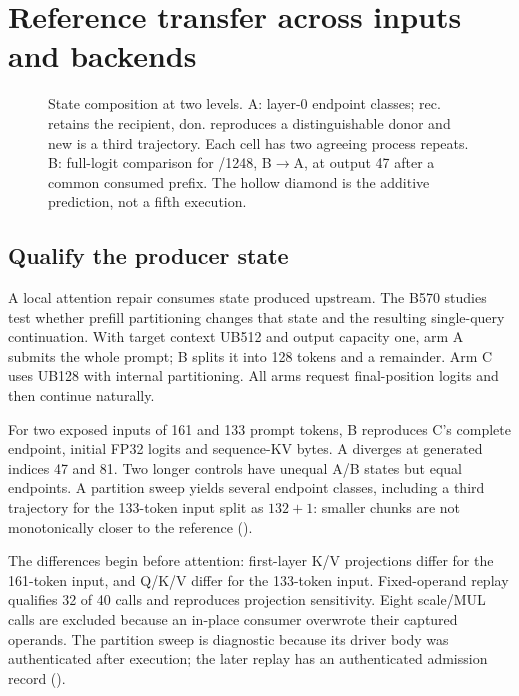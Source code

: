 \section{Reference transfer across inputs and backends}
\label{sec:state}


\begin{figure}[t]\centering
\resizebox{\textwidth}{!}{}
\caption{State composition at two levels. A: layer-0 endpoint classes; rec. retains the recipient, don. reproduces a distinguishable donor and new is a third trajectory. Each cell has two agreeing process repeats. B: full-logit comparison for /1248, B$\to$A, at output 47 after a common consumed prefix. The hollow diamond is the additive prediction, not a fifth execution.}
\label{fig:composition}
\end{figure}

\subsection{Qualify the producer state}
A local attention repair consumes state produced upstream. The B570 studies test whether prefill partitioning changes that state and the resulting single-query continuation. With target context UB512 and output capacity one, arm A submits the whole prompt; B splits it into 128 tokens and a remainder. Arm C uses UB128 with internal partitioning. All arms request final-position logits and then continue naturally.

For two exposed inputs of 161 and 133 prompt tokens, B reproduces C's complete endpoint, initial FP32 logits and sequence-KV bytes. A diverges at generated indices 47 and 81. Two longer controls have unequal A/B states but equal endpoints. A partition sweep yields several endpoint classes, including a third trajectory for the 133-token input split as $132+1$: smaller chunks are not monotonically closer to the reference ().

The differences begin before attention: first-layer K/V projections differ for the 161-token input, and Q/K/V differ for the 133-token input. Fixed-operand replay qualifies 32 of 40 calls and reproduces projection sensitivity. Eight scale/MUL calls are excluded because an in-place consumer overwrote their captured operands. The partition sweep is diagnostic because its driver body was authenticated after execution; the later replay has an authenticated admission record ().

